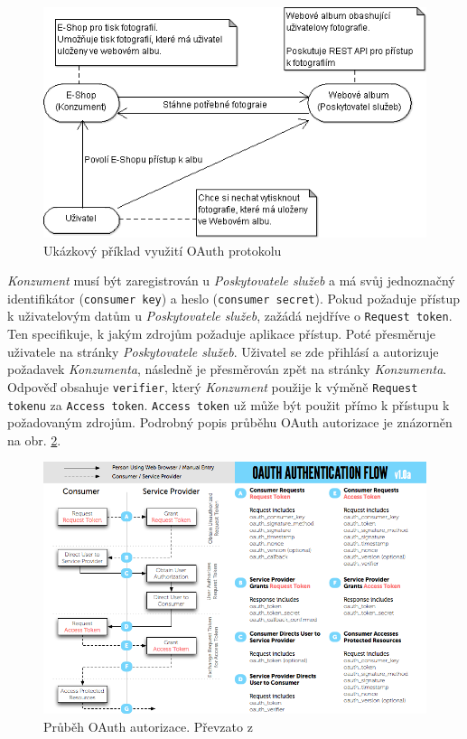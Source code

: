 \documentclass[thesis=M,czech]{FITthesis}[2014/05/6]
\begin{document}
\begin{figure}\centering
 	\includegraphics[width=1\textwidth]{images/diagram/auth_oauth_example}
 	\caption[Ukázkový příklad využití OAuth protokolu]{Ukázkový příklad využití OAuth protokolu}\label{fig:auth_oauth_example}
\end{figure}

\textit{Konzument} musí být zaregistrován u \textit{Poskytovatele služeb} a má svůj jednoznačný identifikátor (\texttt{consumer key}) a heslo (\texttt{consumer secret}).
Pokud požaduje přístup k uživatelovým datům u \textit{Poskytovatele služeb}, zažádá nejdříve o \texttt{Request token}. Ten specifikuje, k jakým zdrojům požaduje aplikace
přístup. Poté přesměruje uživatele na stránky \textit{Poskytovatele služeb}. Uživatel se zde přihlásí a autorizuje požadavek \textit{Konzumenta}, následně je přesměrován 
zpět na stránky \textit{Konzumenta}. Odpověď obsahuje \texttt{verifier}, který \textit{Konzument} použije k výměně \texttt{Request tokenu} za \texttt{Access token}. \texttt{Access token}
už může být použit přímo k přístupu k požadovaným zdrojům. Podrobný popis průběhu OAuth autorizace je znázorněn na obr. \ref{fig:auth-oauth1}.

\begin{figure}\centering
 	\includegraphics[width=1\textwidth]{images/diagram/auth_oauth1}
 	\caption[Průběh OAuth autorizace]{Průběh OAuth autorizace. Převzato z \cite{oauth:v1}}\label{fig:auth-oauth1}
\end{figure}
\end{document}
